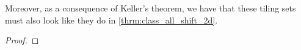 \documentclass[../thesis.tex]{subfiles}
\begin{document}

Moreover, as a consequence of Keller's theorem, we have that these tiling sets must also look like they do in \cref{thrm:class_all_shift_2d}.

\begin{theorem}\label{thrm:class_all_tiling_2d}
\end{theorem}

\begin{proof} %
\end{proof}















\end{document}
